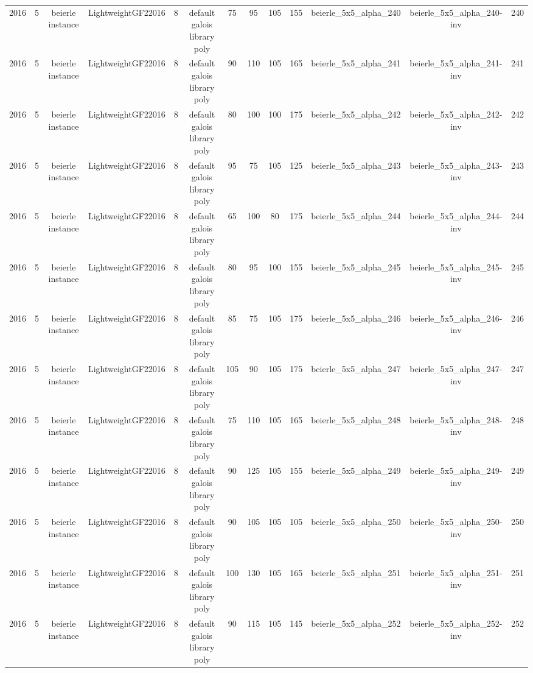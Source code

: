 \begin{tabular}{c c c c c c c c c c c c c}
2016 & 5 & beierle instance & LightweightGF22016 & 8 & default galois library poly & 75 & 95 & 105 & 155 & beierle_5x5_alpha_240 & beierle_5x5_alpha_240-inv & 240 \\
2016 & 5 & beierle instance & LightweightGF22016 & 8 & default galois library poly & 90 & 110 & 105 & 165 & beierle_5x5_alpha_241 & beierle_5x5_alpha_241-inv & 241 \\
2016 & 5 & beierle instance & LightweightGF22016 & 8 & default galois library poly & 80 & 100 & 100 & 175 & beierle_5x5_alpha_242 & beierle_5x5_alpha_242-inv & 242 \\
2016 & 5 & beierle instance & LightweightGF22016 & 8 & default galois library poly & 95 & 75 & 105 & 125 & beierle_5x5_alpha_243 & beierle_5x5_alpha_243-inv & 243 \\
2016 & 5 & beierle instance & LightweightGF22016 & 8 & default galois library poly & 65 & 100 & 80 & 175 & beierle_5x5_alpha_244 & beierle_5x5_alpha_244-inv & 244 \\
2016 & 5 & beierle instance & LightweightGF22016 & 8 & default galois library poly & 80 & 95 & 100 & 155 & beierle_5x5_alpha_245 & beierle_5x5_alpha_245-inv & 245 \\
2016 & 5 & beierle instance & LightweightGF22016 & 8 & default galois library poly & 85 & 75 & 105 & 175 & beierle_5x5_alpha_246 & beierle_5x5_alpha_246-inv & 246 \\
2016 & 5 & beierle instance & LightweightGF22016 & 8 & default galois library poly & 105 & 90 & 105 & 175 & beierle_5x5_alpha_247 & beierle_5x5_alpha_247-inv & 247 \\
2016 & 5 & beierle instance & LightweightGF22016 & 8 & default galois library poly & 75 & 110 & 105 & 165 & beierle_5x5_alpha_248 & beierle_5x5_alpha_248-inv & 248 \\
2016 & 5 & beierle instance & LightweightGF22016 & 8 & default galois library poly & 90 & 125 & 105 & 155 & beierle_5x5_alpha_249 & beierle_5x5_alpha_249-inv & 249 \\
2016 & 5 & beierle instance & LightweightGF22016 & 8 & default galois library poly & 90 & 105 & 105 & 105 & beierle_5x5_alpha_250 & beierle_5x5_alpha_250-inv & 250 \\
2016 & 5 & beierle instance & LightweightGF22016 & 8 & default galois library poly & 100 & 130 & 105 & 165 & beierle_5x5_alpha_251 & beierle_5x5_alpha_251-inv & 251 \\
2016 & 5 & beierle instance & LightweightGF22016 & 8 & default galois library poly & 90 & 115 & 105 & 145 & beierle_5x5_alpha_252 & beierle_5x5_alpha_252-inv & 252 \\

\end{tabular}
